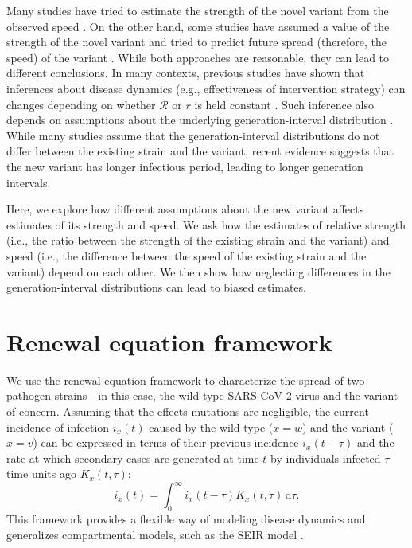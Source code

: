 \documentclass[12pt]{article}
\newcommand{\RR}{\ensuremath{{\mathcal R}}\xspace}
\newcommand{\dd}[1]{\ensuremath{\, \mathrm{d}#1}}
\newcommand{\dtau}{\dd{\tau}}
\begin{document}
Many studies have tried to estimate the strength of the novel variant from the observed speed \citep{davies2021estimated, leung2021early, volz2021transmission,zhao2021}.
On the other hand, some studies have assumed a value of the strength of the novel variant and tried to predict future spread (therefore, the speed) of the variant \citep{davies2021estimated}.
While both approaches are reasonable, they can lead to different conclusions.
In many contexts, previous studies have shown that inferences about disease dynamics (e.g., effectiveness of intervention strategy) can changes depending on whether $\RR$ or $r$ is held constant \citep{dushoff2020speed}.
Such inference also depends on assumptions about the underlying generation-interval distribution \citep{roberts2007model,svensson2007note,wallinga2007generation}.
While many studies assume that the generation-interval distributions do not differ between the existing strain and the variant, recent evidence suggests that the new variant has longer infectious period, leading to longer generation intervals.

Here, we explore how different assumptions about the new variant affects estimates of its strength and speed.
We ask how the estimates of relative strength (i.e., the ratio between the strength of the existing strain and the variant) and speed (i.e., the difference between the speed of the existing strain and the variant) depend on each other.
We then show how neglecting differences in the generation-interval distributions can lead to biased estimates.

\section{Renewal equation framework}

We use the renewal equation framework to characterize the spread of two pathogen strains---in this case, the wild type SARS-CoV-2 virus and the variant of concern.
Assuming that the effects mutations are negligible, the current incidence of infection $i_x(t)$ caused by the wild type ($x=w$) and the variant ($x=v$) can be expressed in terms of their previous incidence $i_x(t-\tau)$ and the rate at which secondary cases are generated at time $t$ by individuals infected $\tau$ time units ago $K_x(t, \tau)$:
\begin{equation}
i_x(t) = \int_0^\infty i_x(t-\tau) K_x(t, \tau) \dtau.
\end{equation}
This framework provides a flexible way of modeling disease dynamics and generalizes compartmental models, such as the SEIR model \citep{heesterbeek1996concept, diekmann2000mathematical, roberts2004modelling, aldis2005integral, roberts2007model, champredon2018equivalence}.
\end{document}
